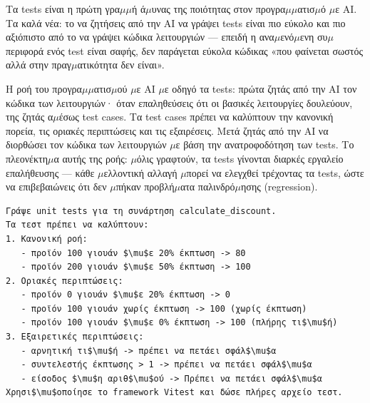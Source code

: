 


Τα tests είναι η πρώτη γρα$\mu$$\mu$ή ά$\mu$υνας της ποιότητας στον προγρα$\mu$$\mu$ατισ$\mu$ό $\mu$ε AI. Τα καλά νέα: το να ζητήσεις από την AI να γράψει tests είναι πιο εύκολο και πιο αξιόπιστο από το να γράψει κώδικα λειτουργιών — επειδή η ανα$\mu$ενό$\mu$ενη συ$\mu$περιφορά ενός test είναι σαφής, δεν παράγεται εύκολα κώδικας «που φαίνεται σωστός αλλά στην πραγ$\mu$ατικότητα δεν είναι».

Η ροή του προγρα$\mu$$\mu$ατισ$\mu$ού $\mu$ε AI $\mu$ε οδηγό τα tests: πρώτα ζητάς από την AI τον κώδικα των λειτουργιών· όταν επαληθεύσεις ότι οι βασικές λειτουργίες δουλεύουν, της ζητάς α$\mu$έσως test cases. Τα test cases πρέπει να καλύπτουν την κανονική πορεία, τις οριακές περιπτώσεις και τις εξαιρέσεις. Μετά ζητάς από την AI να διορθώσει τον κώδικα των λειτουργιών $\mu$ε βάση την ανατροφοδότηση των tests. Το πλεονέκτη$\mu$α αυτής της ροής: $\mu$όλις γραφτούν, τα tests γίνονται διαρκές εργαλείο επαλήθευσης — κάθε $\mu$ελλοντική αλλαγή $\mu$πορεί να ελεγχθεί τρέχοντας τα tests, ώστε να επιβεβαιώνεις ότι δεν $\mu$πήκαν προβλή$\mu$ατα παλινδρό$\mu$ησης (regression).

\begin{lstlisting}
Γράψε unit tests για τη συνάρτηση calculate_discount.
Τα τεστ πρέπει να καλύπτουν:
1. Κανονική ροή:
   - προϊόν 100 γιουάν $\mu$ε 20% έκπτωση -> 80
   - προϊόν 200 γιουάν $\mu$ε 50% έκπτωση -> 100
2. Οριακές περιπτώσεις:
   - προϊόν 0 γιουάν $\mu$ε 20% έκπτωση -> 0
   - προϊόν 100 γιουάν χωρίς έκπτωση -> 100 (χωρίς έκπτωση)
   - προϊόν 100 γιουάν $\mu$ε 0% έκπτωση -> 100 (πλήρης τι$\mu$ή)
3. Εξαιρετικές περιπτώσεις:
   - αρνητική τι$\mu$ή -> πρέπει να πετάει σφάλ$\mu$α
   - συντελεστής έκπτωσης > 1 -> πρέπει να πετάει σφάλ$\mu$α
   - είσοδος $\mu$η αριθ$\mu$ού -> Πρέπει να πετάει σφάλ$\mu$α
Χρησι$\mu$οποίησε το framework Vitest και δώσε πλήρες αρχείο τεστ.
\end{lstlisting}

